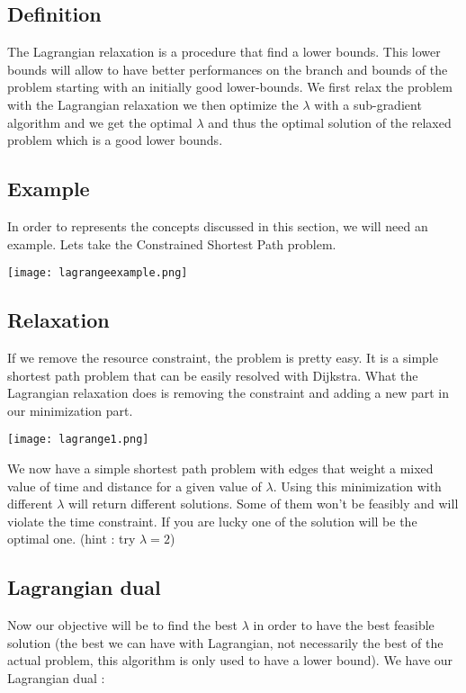 \subsection{Definition}
The Lagrangian relaxation is a procedure that find a lower bounds. This lower bounds will allow to have better performances on the branch and bounds of the problem starting with an initially good lower-bounds.
We first relax the problem with the Lagrangian relaxation we then optimize the $\lambda$ with a sub-gradient algorithm and we get the optimal $\lambda$ and thus the optimal solution of the relaxed problem which is a good lower bounds.

\subsection{Example}
In order to represents the concepts discussed in this section, we will need an example. Lets take the Constrained Shortest Path problem.

\centerline{\texttt{[image: lagrangeexample.png]}}

\subsection{Relaxation}
If we remove the resource constraint, the problem is pretty easy. It is a simple shortest path problem that can be easily resolved with Dijkstra. What the Lagrangian relaxation does is removing the constraint and adding a new part in our minimization part.

\centerline{\texttt{[image: lagrange1.png]}}

We now have a simple shortest path problem with edges that weight a mixed value of time and distance for a given value of $\lambda$. Using this minimization with different $\lambda$ will return different solutions. Some of them won't be feasibly and will violate the time constraint. If you are lucky one of the solution will be the optimal one. (hint : try $\lambda = 2$)

\subsection{Lagrangian dual}
Now our objective will be to find the best $\lambda$ in order to have the best feasible solution (the best we can have with Lagrangian, not necessarily the best of the actual problem, this algorithm is only used to have a lower bound). We have our Lagrangian dual : 

